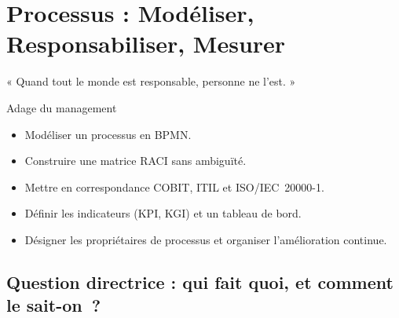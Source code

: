 
\chapter{Processus : Modéliser, Responsabiliser, Mesurer}
\label{chap:processus}

\epigraph{%
    « Quand tout le monde est responsable, personne ne l'est. »%
}{Adage du management}


\begin{boxobjectifs}
\begin{itemize}
    \item Modéliser un processus en BPMN.
    \item Construire une matrice RACI sans ambiguïté.
    \item Mettre en correspondance COBIT, ITIL et ISO/IEC~20000-1.
    \item Définir les indicateurs (KPI, KGI) et un tableau de bord.
    \item Désigner les propriétaires de processus et organiser
          l'amélioration continue.
\end{itemize}
\end{boxobjectifs}

\bigskip

\section*{Question directrice : qui fait quoi, et comment le sait-on~?}

